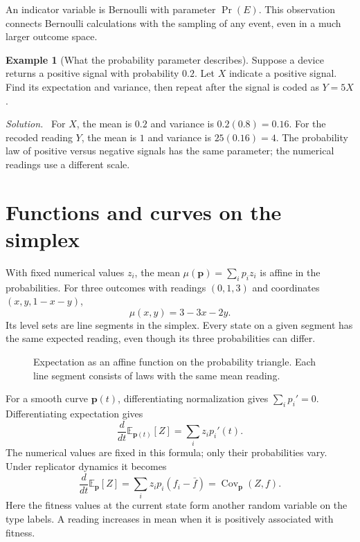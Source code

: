 \documentclass[11pt,oneside,openany]{book}
\theoremstyle{definition}
\newtheorem{example}{Example}[chapter]
\theoremstyle{remark}
\newenvironment{solution}{\par\smallskip\noindent\textit{Solution.}\ }{\par\smallskip}
\newcommand{\E}{\mathbb{E}}
\newcommand{\Cov}{\operatorname{Cov}}
\newcommand{\p}{\mathbf{p}}
\numberwithin{equation}{chapter}
\begin{document}
An indicator variable is Bernoulli with parameter $\Pr(E)$. This observation connects Bernoulli calculations with the sampling of any event, even in a much larger outcome space.

\begin{example}[What the probability parameter describes]
Suppose a device returns a positive signal with probability $0.2$. Let $X$ indicate a positive signal. Find its expectation and variance, then repeat after the signal is coded as $Y=5X$.
\begin{solution}
For $X$, the mean is $0.2$ and variance is $0.2(0.8)=0.16$. For the recoded reading $Y$, the mean is $1$ and variance is $25(0.16)=4$. The probability law of positive versus negative signals has the same parameter; the numerical readings use a different scale.
\end{solution}
\end{example}

\section{Functions and curves on the simplex}
With fixed numerical values $z_i$, the mean $\mu(\p)=\sum_i p_i z_i$ is affine in the probabilities. For three outcomes with readings $(0,1,3)$ and coordinates $(x,y,1-x-y)$,
\[
\mu(x,y)=3-3x-2y.
\]
Its level sets are line segments in the simplex. Every state on a given segment has the same expected reading, even though its three probabilities can differ.

\begin{figure}[htbp]
\centering
{}
\caption{Expectation as an affine function on the probability triangle. Each line segment consists of laws with the same mean reading.}
\end{figure}

For a smooth curve $\p(t)$, differentiating normalization gives $\sum_i p_i'=0$. Differentiating expectation gives
\begin{equation}\label{eq:meanvelocity}
\frac{d}{dt}\E_{\p(t)}[Z]=\sum_i z_i p_i'(t).
\end{equation}
The numerical values are fixed in this formula; only their probabilities vary. Under replicator dynamics it becomes
\begin{equation}\label{eq:covarianceidentity}
\frac{d}{dt}\E_\p[Z]=\sum_i z_i p_i(f_i-\bar f)=\Cov_\p(Z,f).
\end{equation}
Here the fitness values at the current state form another random variable on the type labels. A reading increases in mean when it is positively associated with fitness.
\end{document}

